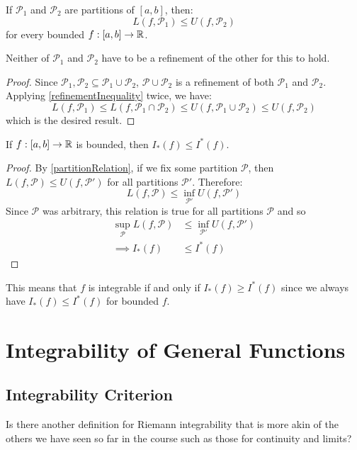 \documentclass[../main.tex]{subfiles}
\begin{document}
\begin{corollary}
  If $\mathcal{P}_1$ and $\mathcal{P}_2$ are partitions of $[a, b]$, then:
  \label{partitionRelation}
  \[
    L(f, \mathcal{P}_1) \leq U(f, \mathcal{P}_2)
  \]
  for every bounded $f: [a, b] \to \mathbb{R}$.
\end{corollary}
\begin{remark}[Note]
  Neither of $\mathcal{P}_1$ and $\mathcal{P}_2$ have to be a refinement of the other for this to hold.
\end{remark}
\begin{proof}
  Since $\mathcal{P}_1, \mathcal{P}_2 \subseteq \mathcal{P}_1 \cup \mathcal{P}_2$, $\mathcal{P} \cup \mathcal{P}_2$ is a refinement of both $\mathcal{P}_1$ and $\mathcal{P}_2$.
  Applying \cref{refinementInequality} twice, we have:
  \[
    L(f, \mathcal{P}_1) \leq L(f, \mathcal{P}_1 \cap \mathcal{P}_2) \leq U(f, \mathcal{P}_1 \cup \mathcal{P}_2) \leq U(f, \mathcal{P}_2)
  \]
  which is the desired result.
\end{proof}
\begin{corollary}
  If $f: [a, b] \to \mathbb{R}$ is bounded, then $I_*(f) \leq I^{*}(f)$.
  \label{upperLowerIntegralRelation}
\end{corollary}
\begin{proof}
  By \cref{partitionRelation}, if we fix some partition $\mathcal{P}$, then $L(f, \mathcal{P}) \leq U(f, \mathcal{P}')$ for all partitions $\mathcal{P}'$.
  Therefore:
  \[
    L(f, \mathcal{P}) \leq \inf_{\mathcal{P}'} U(f, \mathcal{P}')
  \]
  Since $\mathcal{P}$ was arbitrary, this relation is true for all partitions $\mathcal{P}$ and so
  \begin{align*}
    \sup_{\mathcal{P}} L(f, \mathcal{P}) &\leq \inf_{\mathcal{P}'} U(f, \mathcal{P'}) \\
    \implies I_{*}(f) &\leq I^{*}(f)
  \end{align*}
\end{proof}
\begin{remark}
  This means that $f$ is integrable if and only if $I_{*}(f) \geq I^{*}(f)$ since we always have $I_{*}(f) \leq I^{*}(f)$ for bounded $f$.
\end{remark}
\section{Integrability of General Functions}
\subsection{Integrability Criterion}
Is there another definition for Riemann integrability that is more akin of the others we have seen so far in the course such as those for continuity and limits?
\end{document}
